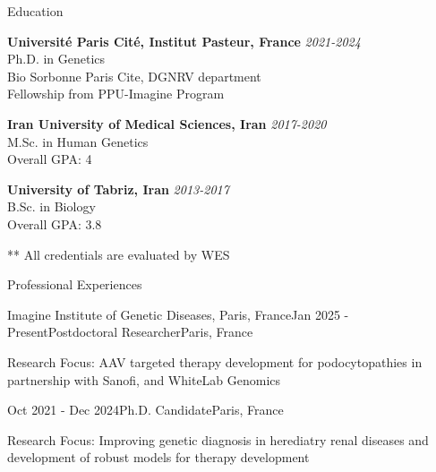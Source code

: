 \documentclass[
	11pt, %
]{resume} %
\begin{document}

\begin{rSection}{Education}
	
	\textbf{Université Paris Cité, Institut Pasteur, France} \hfill \textit{2021-2024} \\ 
	Ph.D. in Genetics \\
	Bio Sorbonne Paris Cite, DGNRV department \\
	Fellowship from PPU-Imagine Program 
	
	\textbf{Iran University of Medical Sciences, Iran} \hfill \textit{2017-2020} \\ 
	M.Sc. in Human Genetics  \\
	Overall GPA: 4
	
	\textbf{University of Tabriz, Iran} \hfill \textit{2013-2017} \\ 
	B.Sc. in Biology  \\
	Overall GPA: 3.8
	
	** All credentials are evaluated by WES
	
\end{rSection}


\begin{rSection}{Professional Experiences}

	\begin{rSubsection}{Imagine Institute of Genetic Diseases, Paris, France}{Jan 2025 - Present}{Postdoctoral Researcher}{Paris, France}
		\item Research Focus: AAV targeted therapy development for podocytopathies in partnership with Sanofi, and WhiteLab Genomics
	\end{rSubsection}


	\begin{rSubsection}{}{Oct 2021 - Dec 2024}{Ph.D. Candidate}{Paris, France}
		\item Research Focus: Improving genetic diagnosis in herediatry renal diseases and development of robust models for therapy development
		\item 
	\end{rSubsection}
	
\end{rSection}
\end{document}
